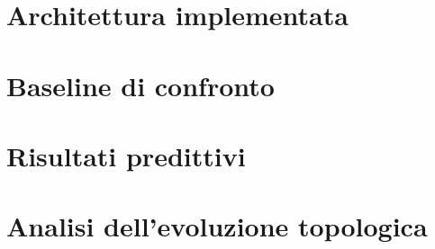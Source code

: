\section{Architettura implementata}
\label{sec:implemented-architecture}

\section{Baseline di confronto}
\label{sec:comparison-baselines}

\section{Risultati predittivi}
\label{sec:predictive-results}

\section{Analisi dell'evoluzione topologica}
\label{sec:topological-evolution-analysis}

